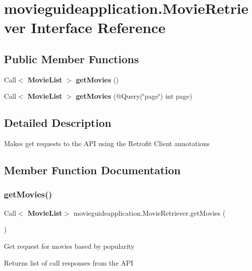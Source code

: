 \section{movieguideapplication.\+Movie\+Retriever Interface Reference}
\label{interfacemovieguideapplication_1_1_movie_retriever}
\subsection*{Public Member Functions}
\begin{DoxyCompactItemize}
\item 
Call$<$ \textbf{ Movie\+List} $>$ \textbf{ get\+Movies} ()
\item 
Call$<$ \textbf{ Movie\+List} $>$ \textbf{ get\+Movies} (@Query(\char`\"{}page\char`\"{}) int page)
\end{DoxyCompactItemize}


\subsection{Detailed Description}
Makes get requests to the A\+PI using the Retrofit Client annotations 

\subsection{Member Function Documentation}
\mbox{\label{interfacemovieguideapplication_1_1_movie_retriever_a2f5c95d2cfb882c13b914994fd722ff0}} 
\subsubsection{get\+Movies()\hspace{0.1cm}{\footnotesize\ttfamily [1/2]}}
{\footnotesize\ttfamily Call$<$\textbf{ Movie\+List}$>$ movieguideapplication.\+Movie\+Retriever.\+get\+Movies (\begin{DoxyParamCaption}{ }\end{DoxyParamCaption})}

Get request for movies based by popularity \begin{DoxyReturn}{Returns}
list of call responses from the A\+PI 
\end{DoxyReturn}
\mbox{\label{interfacemovieguideapplication_1_1_movie_retriever_a5340c26b91170dc7aa275847cee41dbc}} 
